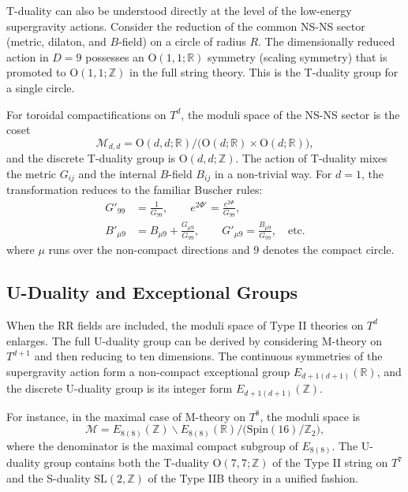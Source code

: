 \documentclass[11pt]{article}
\begin{document}
T-duality can also be understood directly at the level of the low-energy supergravity actions. Consider the reduction of the common NS-NS sector (metric, dilaton, and $B$-field) on a circle of radius $R$. The dimensionally reduced action in $D=9$ possesses an $\mathrm{O}(1,1;\mathbb{R})$ symmetry (scaling symmetry) that is promoted to $\mathrm{O}(1,1;\mathbb{Z})$ in the full string theory. This is the T-duality group for a single circle.

For toroidal compactifications on $T^d$, the moduli space of the NS-NS sector is the coset
\begin{equation}
\mathcal{M}_{d,d} = \mathrm{O}(d,d;\mathbb{R}) / \bigl( \mathrm{O}(d;\mathbb{R}) \times \mathrm{O}(d;\mathbb{R}) \bigr),
\end{equation}
and the discrete T-duality group is $\mathrm{O}(d,d;\mathbb{Z})$. The action of T-duality mixes the metric $G_{ij}$ and the internal $B$-field $B_{ij}$ in a non-trivial way. For $d=1$, the transformation reduces to the familiar Buscher rules:
\begin{align}
G'_{99} &= \frac{1}{G_{99}}, \qquad e^{2\Phi'} = \frac{e^{2\Phi}}{G_{99}}, \\
B'_{\mu 9} &= B_{\mu 9} + \frac{G_{\mu 9}}{G_{99}}, \qquad G'_{\mu 9} = \frac{B_{\mu 9}}{G_{99}}, \quad \text{etc.}
\end{align}
where $\mu$ runs over the non-compact directions and $9$ denotes the compact circle.

\subsection{U-Duality and Exceptional Groups}

When the RR fields are included, the moduli space of Type II theories on $T^d$ enlarges. The full U-duality group can be derived by considering M-theory on $T^{d+1}$ and then reducing to ten dimensions. The continuous symmetries of the supergravity action form a non-compact exceptional group $E_{d+1(d+1)}(\mathbb{R})$, and the discrete U-duality group is its integer form $E_{d+1(d+1)}(\mathbb{Z})$.

For instance, in the maximal case of M-theory on $T^8$, the moduli space is
\begin{equation}
\mathcal{M} = E_{8(8)}(\mathbb{Z}) \backslash E_{8(8)}(\mathbb{R}) / \bigl( \mathrm{Spin}(16) / \mathbb{Z}_2 \bigr),
\end{equation}
where the denominator is the maximal compact subgroup of $E_{8(8)}$. The U-duality group contains both the T-duality $\mathrm{O}(7,7;\mathbb{Z})$ of the Type II string on $T^7$ and the S-duality $\mathrm{SL}(2,\mathbb{Z})$ of the Type IIB theory in a unified fashion.
\end{document}

